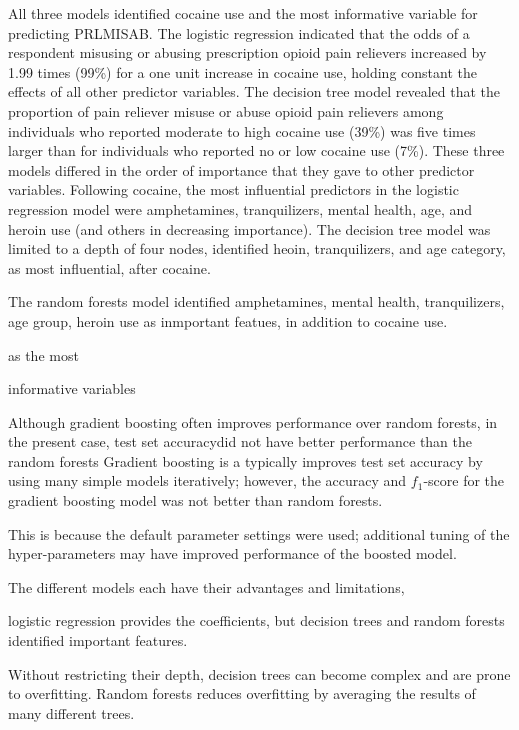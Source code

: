 \documentclass[sigconf]{acmart}
\begin{document}
All three models identified cocaine use and the most informative variable 
for predicting PRLMISAB. The logistic regression indicated that the odds of 
a respondent misusing or abusing prescription opioid pain relievers increased 
by 1.99 times (99\%) for a one unit increase in cocaine use, holding constant 
the effects of all other predictor variables. The decision tree model revealed 
that the proportion of pain reliever misuse or abuse opioid pain relievers 
among individuals who reported moderate to high cocaine use (39\%) was 
five times larger than for individuals who reported no or low cocaine use 
(7\%). These three models differed in the order of importance that they 
gave to other predictor variables. Following cocaine, the most influential
predictors in the logistic regression model were amphetamines, tranquilizers, 
mental health, age, and heroin use (and others in decreasing importance). 
The decision tree model was limited to a depth of four nodes, identified
heoin, tranquilizers, and age category, as most influential, after cocaine. 

The random forests model identified amphetamines, mental health, tranquilizers,
age group, heroin use as inmportant featues, in addition to cocaine use. 


as the most 

informative variables 





Although gradient boosting often improves performance over random forests, 
in the present case, test set accuracydid not have better performance than the 
random forests
Gradient boosting is a typically improves test set accuracy by using many simple
models iteratively; however, the accuracy and $f_1$-score for the gradient 
boosting model was not better than random forests.

This is because the default parameter settings were used; additional tuning of 
the hyper-parameters may have improved performance of the boosted model.


The different models each have their advantages and limitations, 

logistic regression provides the coefficients, but decision trees and 
random forests identified important features.

Without restricting their depth, decision trees can become complex and are 
prone to overfitting. Random forests reduces overfitting by averaging the results of many different
trees.
\end{document}
